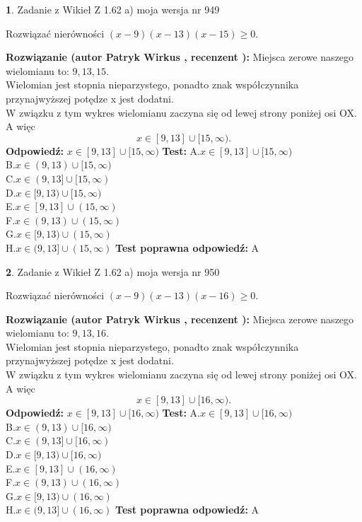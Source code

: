 \documentclass[12pt, a4paper]{article}
\theoremstyle{definition} %
\newtheorem{zad}{}
\newcommand{\zadStart}[1]{\begin{zad}#1\newline}
\newcommand{\zadStop}{\end{zad}}
\newcommand{\rozwStart}[2]{\noindent \textbf{Rozwiązanie (autor #1 , recenzent #2): }\newline}
\newcommand{\rozwStop}{\newline}
\newcommand{\odpStart}{\noindent \textbf{Odpowiedź:}\newline}
\newcommand{\odpStop}{\newline}
\newcommand{\testStart}{\noindent \textbf{Test:}\newline}
\newcommand{\testStop}{\newline}
\newcommand{\kluczStart}{\noindent \textbf{Test poprawna odpowiedź:}\newline}
\newcommand{\kluczStop}{\newline}
\begin{document}
\zadStart{Zadanie z Wikieł Z 1.62 a) moja wersja nr 949}

Rozwiązać nierówności $(x-9)(x-13)(x-15)\ge0$.
\zadStop
\rozwStart{Patryk Wirkus}{}
Miejsca zerowe naszego wielomianu to: $9, 13, 15$.\\
Wielomian jest stopnia nieparzystego, ponadto znak współczynnika przy\linebreak najwyższej potędze x jest dodatni.\\ W związku z tym wykres wielomianu zaczyna się od lewej strony poniżej osi OX. A więc $$x \in [9,13] \cup [15,\infty).$$
\rozwStop
\odpStart
$x \in [9,13] \cup [15,\infty)$
\odpStop
\testStart
A.$x \in [9,13] \cup [15,\infty)$\\
B.$x \in (9,13) \cup [15,\infty)$\\
C.$x \in (9,13] \cup [15,\infty)$\\
D.$x \in [9,13) \cup [15,\infty)$\\
E.$x \in [9,13] \cup (15,\infty)$\\
F.$x \in (9,13) \cup (15,\infty)$\\
G.$x \in [9,13) \cup (15,\infty)$\\
H.$x \in (9,13] \cup (15,\infty)$
\testStop
\kluczStart
A
\kluczStop



\zadStart{Zadanie z Wikieł Z 1.62 a) moja wersja nr 950}

Rozwiązać nierówności $(x-9)(x-13)(x-16)\ge0$.
\zadStop
\rozwStart{Patryk Wirkus}{}
Miejsca zerowe naszego wielomianu to: $9, 13, 16$.\\
Wielomian jest stopnia nieparzystego, ponadto znak współczynnika przy\linebreak najwyższej potędze x jest dodatni.\\ W związku z tym wykres wielomianu zaczyna się od lewej strony poniżej osi OX. A więc $$x \in [9,13] \cup [16,\infty).$$
\rozwStop
\odpStart
$x \in [9,13] \cup [16,\infty)$
\odpStop
\testStart
A.$x \in [9,13] \cup [16,\infty)$\\
B.$x \in (9,13) \cup [16,\infty)$\\
C.$x \in (9,13] \cup [16,\infty)$\\
D.$x \in [9,13) \cup [16,\infty)$\\
E.$x \in [9,13] \cup (16,\infty)$\\
F.$x \in (9,13) \cup (16,\infty)$\\
G.$x \in [9,13) \cup (16,\infty)$\\
H.$x \in (9,13] \cup (16,\infty)$
\testStop
\kluczStart
A
\kluczStop
\end{document}
